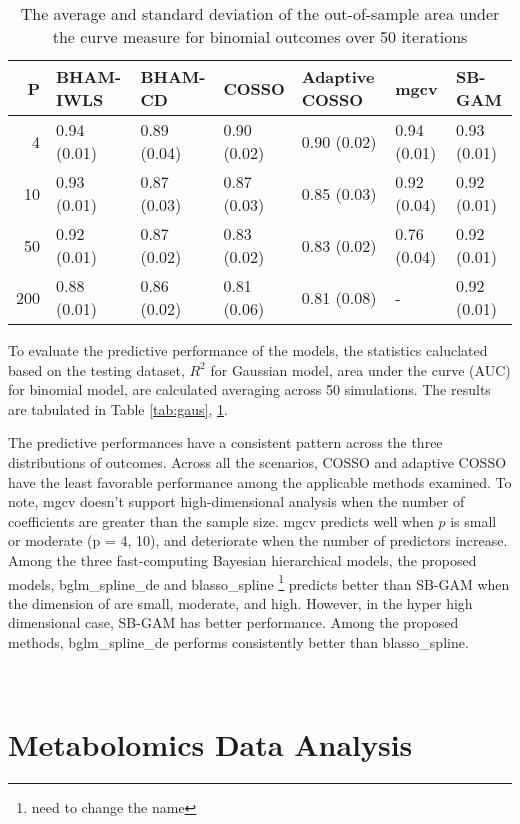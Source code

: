 \documentclass[AMA,STIX1COL,]{WileyNJD-v2}
\begin{document}
\begin{table}[ht]
\centering
\begin{tabular}{rllllll}
  \hline
P & BHAM-IWLS & BHAM-CD & COSSO & Adaptive COSSO & mgcv & SB-GAM \\ 
  \hline
  4 & 0.94 (0.01) & 0.89 (0.04) & 0.90 (0.02) & 0.90 (0.02) & 0.94 (0.01) & 0.93 (0.01) \\ 
   10 & 0.93 (0.01) & 0.87 (0.03) & 0.87 (0.03) & 0.85 (0.03) & 0.92 (0.04) & 0.92 (0.01) \\ 
   50 & 0.92 (0.01) & 0.87 (0.02) & 0.83 (0.02) & 0.83 (0.02) & 0.76 (0.04) & 0.92 (0.01) \\ 
  200 & 0.88 (0.01) & 0.86 (0.02) & 0.81 (0.06) & 0.81 (0.08) & - & 0.92 (0.01) \\ 
   \hline
\end{tabular}
\caption{The average and standard deviation of the out-of-sample area under the curve measure for binomial outcomes over 50 iterations} 
\label{tab:bin_auc}
\end{table}

To evaluate the predictive performance of the models, the statistics
caluclated based on the testing dataset, \(R^2\) for Gaussian model,
area under the curve (AUC) for binomial model, are calculated averaging
across 50 simulations. The results are tabulated in Table
\ref{tab:gaus}, \ref{tab:bin_auc}.

The predictive performances have a consistent pattern across the three
distributions of outcomes. Across all the scenarios, COSSO and adaptive
COSSO have the least favorable performance among the applicable methods
examined. To note, mgcv doesn't support high-dimensional analysis when
the number of coefficients are greater than the sample size. mgcv
predicts well when \(p\) is small or moderate (p = 4, 10), and
deteriorate when the number of predictors increase. Among the three
fast-computing Bayesian hierarchical models, the proposed models,
bglm\_spline\_de and blasso\_spline \footnote{need to change the name}
predicts better than SB-GAM when the dimension of are small, moderate,
and high. However, in the hyper high dimensional case, SB-GAM has better
performance. Among the proposed methods, bglm\_spline\_de performs
consistently better than blasso\_spline.

~

\hypertarget{metabolomics-data-analysis}{%
\section{Metabolomics Data Analysis}\label{metabolomics-data-analysis}}
\end{document}
